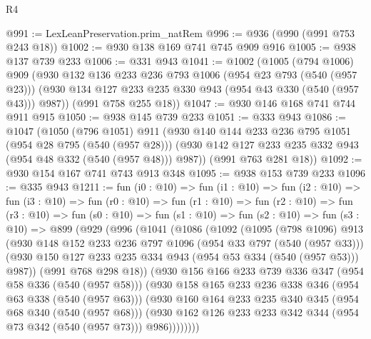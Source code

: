 \begin{lexlean}{R4}
\begin{coremodule}
@991 := LexLeanPreservation.prim_natRem
@996 := @936 (@990 (@991 @753 @243 @18))
@1002 := @930 @138 @169 @741 @745 @909 @916
@1005 := @938 @137 @739 @233
@1006 := @331 @943
@1041 := @1002
    (@1005
      (@794 @1006)
      @909
      (@930
        @132
        @136
        @233
        @236
        @793
        @1006
        (@954 @23 @793 (@540 (@957 @23)))
        (@930 @134 @127 @233 @235 @330 @943 (@954 @43 @330 (@540 (@957 @43))) @987))
      (@991 @758 @255 @18))
@1047 := @930 @146 @168 @741 @744 @911 @915
@1050 := @938 @145 @739 @233
@1051 := @333 @943
@1086 := @1047
    (@1050
      (@796 @1051)
      @911
      (@930
        @140
        @144
        @233
        @236
        @795
        @1051
        (@954 @28 @795 (@540 (@957 @28)))
        (@930 @142 @127 @233 @235 @332 @943 (@954 @48 @332 (@540 (@957 @48))) @987))
      (@991 @763 @281 @18))
@1092 := @930 @154 @167 @741 @743 @913 @348
@1095 := @938 @153 @739 @233
@1096 := @335 @943
@1211 := fun (i0 : @10) =>
  fun (i1 : @10) =>
  fun (i2 : @10) =>
  fun (i3 : @10) =>
  fun (r0 : @10) =>
  fun (r1 : @10) =>
  fun (r2 : @10) =>
  fun (r3 : @10) =>
  fun (s0 : @10) =>
  fun (s1 : @10) =>
  fun (s2 : @10) =>
  fun (s3 : @10) =>
  @899
    (@929
      (@996
        (@1041
          (@1086
            (@1092
              (@1095
                (@798 @1096)
                @913
                (@930
                  @148
                  @152
                  @233
                  @236
                  @797
                  @1096
                  (@954 @33 @797 (@540 (@957 @33)))
                  (@930 @150 @127 @233 @235 @334 @943 (@954 @53 @334 (@540 (@957 @53))) @987))
                (@991 @768 @298 @18))
              (@930
                @156
                @166
                @233
                @739
                @336
                @347
                (@954 @58 @336 (@540 (@957 @58)))
                (@930
                  @158
                  @165
                  @233
                  @236
                  @338
                  @346
                  (@954 @63 @338 (@540 (@957 @63)))
                  (@930
                    @160
                    @164
                    @233
                    @235
                    @340
                    @345
                    (@954 @68 @340 (@540 (@957 @68)))
                    (@930
                      @162
                      @126
                      @233
                      @233
                      @342
                      @344
                      (@954 @73 @342 (@540 (@957 @73)))
                      @986))))))))

\end{coremodule}
\end{lexlean}
